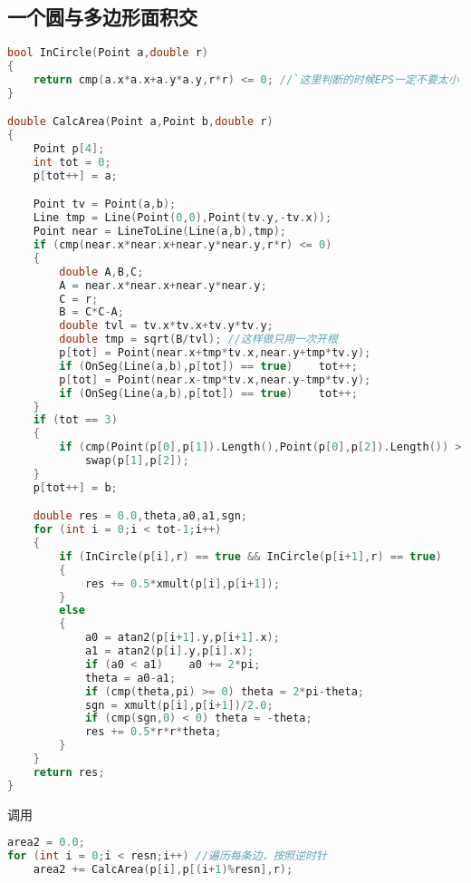 \subsection{一个圆与多边形面积交}
	\begin{lstlisting}[language=c++]
bool InCircle(Point a,double r)
{
	return cmp(a.x*a.x+a.y*a.y,r*r) <= 0; //`这里判断的时候EPS一定不要太小！！`
}

double CalcArea(Point a,Point b,double r)
{
	Point p[4];
	int tot = 0;
	p[tot++] = a;

	Point tv = Point(a,b);
	Line tmp = Line(Point(0,0),Point(tv.y,-tv.x));
	Point near = LineToLine(Line(a,b),tmp);
	if (cmp(near.x*near.x+near.y*near.y,r*r) <= 0)
	{
		double A,B,C;
		A = near.x*near.x+near.y*near.y;
		C = r;
		B = C*C-A;
		double tvl = tv.x*tv.x+tv.y*tv.y;
		double tmp = sqrt(B/tvl); //这样做只用一次开根
		p[tot] = Point(near.x+tmp*tv.x,near.y+tmp*tv.y);
		if (OnSeg(Line(a,b),p[tot]) == true)	tot++;
		p[tot] = Point(near.x-tmp*tv.x,near.y-tmp*tv.y);
		if (OnSeg(Line(a,b),p[tot]) == true)	tot++;
	}
	if (tot == 3)
	{
		if (cmp(Point(p[0],p[1]).Length(),Point(p[0],p[2]).Length()) > 0)
			swap(p[1],p[2]);
	}
	p[tot++] = b;

	double res = 0.0,theta,a0,a1,sgn;
	for (int i = 0;i < tot-1;i++)
	{
		if (InCircle(p[i],r) == true && InCircle(p[i+1],r) == true)
		{
			res += 0.5*xmult(p[i],p[i+1]);
		}
		else
		{
			a0 = atan2(p[i+1].y,p[i+1].x);
			a1 = atan2(p[i].y,p[i].x);
			if (a0 < a1)	a0 += 2*pi;
			theta = a0-a1;
			if (cmp(theta,pi) >= 0) theta = 2*pi-theta;
			sgn = xmult(p[i],p[i+1])/2.0;
			if (cmp(sgn,0) < 0) theta = -theta;
			res += 0.5*r*r*theta;
		}
	}
	return res;
}
	\end{lstlisting}
	调用
	\begin{lstlisting}[language=c++]
area2 = 0.0;
for (int i = 0;i < resn;i++) //遍历每条边，按照逆时针
	area2 += CalcArea(p[i],p[(i+1)%resn],r);
	\end{lstlisting}
